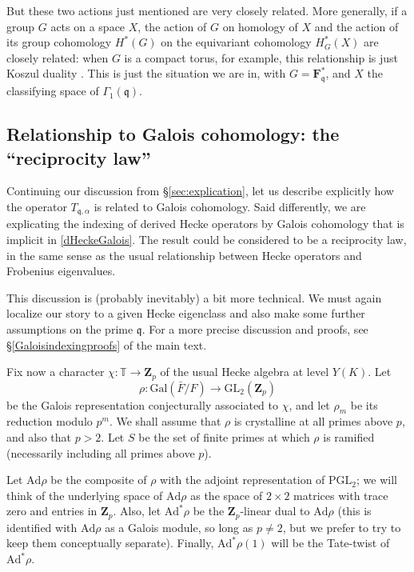 \documentclass[10pt]{amsart}
\newcommand{\Z}{\mathbf{Z}}
\newcommand{\Gal}{\mathrm{Gal}}
\newcommand{\Ad}{\mathrm{Ad}}
\newcommand{\PGL}{\mathrm{PGL}}
\newcommand{\ramprimes}{S}
\newcommand{\GL}{\mathrm{GL}}
\theoremstyle{remark}
\begin{document}
But these two  actions just mentioned are very closely related. More generally, 
if a group $G$ acts on a space $X$, the action of $G$ on  homology of $X$
and the action of its group cohomology $H^*(G)$ on the equivariant cohomology $H_G^*(X)$
are closely related: when $G$ is a compact torus, 
for example, this relationship is just Koszul duality \cite{GKM}.  This is  just the situation we are in, with $G = \mathbf{F}_{\mathfrak{q}}^*$,
and $X$ the  classifying space of $\Gamma_1(\mathfrak{q})$. 


\subsection{Relationship to Galois cohomology: the ``reciprocity law''} \label{Galoisindexing} 

  Continuing our discussion from \S \ref{sec:explication},   let us describe explicitly how the operator $T_{\mathfrak{q},\alpha}$ is related to Galois cohomology.  
  Said differently, we are explicating the indexing of derived Hecke operators by Galois cohomology that
  is implicit in \eqref{dHeckeGalois}.
The result could be considered to be a reciprocity law, in the same sense as the usual relationship between Hecke operators and Frobenius eigenvalues.
  
  This discussion is (probably inevitably) a bit more technical.  We must again localize our story to a given Hecke eigenclass and  also make some further assumptions on the prime $\mathfrak{q}$.  
For a more precise discussion and proofs, see \S \ref{Galoisindexingproofs} of the main text. 

Fix now a character $\chi: \mathbb{T} \rightarrow \Z_{p}$
of the usual Hecke algebra at level $Y(K)$. 
 Let $$\rho: \Gal(\bar{F}/F) \rightarrow \GL_2(\Z_{p})$$ be the  Galois representation 
 conjecturally associated to $\chi$, 
and let $\rho_m$ be its reduction modulo $p^m$.
We shall assume that $\rho$ is crystalline at all primes above $p$, and also that $p >2$.  Let $\ramprimes$ be the set of finite primes  at which $\rho$ is ramified
(necessarily including all primes above $p$). 

 
Let $\Ad \rho$ be the composite of $\rho$ with the adjoint
representation of $\PGL_2$; 
we will think of the underlying space
of $\Ad \rho$ as the space of $2 \times 2$ matrices with trace zero and entries in $\Z_{p}$. 
Also, let 
  $\Ad^* \rho$  be the $\Z_{p}$-linear dual to $\Ad \rho$ (this is identified with $\Ad \rho$ as a Galois module, so long as $p \neq 2$,
   but we prefer to try to keep them conceptually separate). Finally, $\Ad^* \rho(1)$
will be the Tate-twist of $\Ad^* \rho$. 
 
\end{document}
